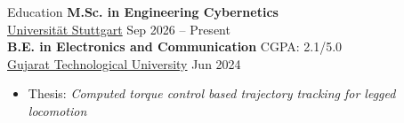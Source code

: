 \documentclass{resume}
\begin{document}
\fancyheadoffset[RO]{5em}
\fancyfootoffset[RO]{0cm}
\thispagestyle{firstpage}
\vspace{-10pt}
\begin{rSection}{Education}
{\textbf {M.Sc. in Engineering Cybernetics}} \\
{\href{https://www.uni-stuttgart.de/studium/master/engineering-cybernetics-m.sc./}{Universität Stuttgart}} \hfill {Sep 2026 -- Present} \\
{\textbf {B.E. in Electronics and Communication}} \hfill {CGPA: 2.1/5.0} \\
{\href{https://www.gtu.ac.in/}{Gujarat Technological University}} \hfill {Jun 2024} 
\begin{itemize}
  \item[] \vspace{-0.5em} \hspace{-1.0em} Thesis: \emph{Computed torque control based trajectory tracking for legged locomotion} 
\end{itemize}
\end{rSection}
\end{document}
